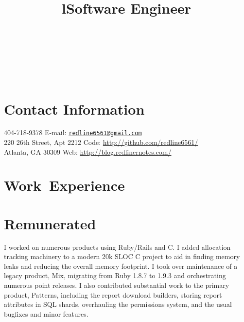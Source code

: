 \documentclass[margintitle,line]{res}
\renewcommand{\subsection}[1]{\section{\normalfont #1}}
\begin{document}

\begin{resume}

\begin{format}
\\
\title{l}\\
\body\\
\end{format}



\section{Contact Information}

404-718-9378 \hfill {E-mail:} \href{mailto:redline6561@gmail.com}{\nolinkurl{redline6561@gmail.com}} \\
220 26th Street, Apt 2212 \hfill {Code:} \url{http://github.com/redline6561/} \\
Atlanta, GA 30309 \hfill {Web:} \url{http://blog.redlinernotes.com/} \\


\section{\mbox{Work Experience}}

\subsection{Remunerated}

\title{Software Engineer}
\begin{position}
  I worked on numerous products using Ruby/Rails and C. I added allocation
  tracking machinery to a modern 20k SLOC C project to aid in finding memory
  leaks and reducing the overall memory footprint. I took over maintenance of
  a legacy product, Mix, migrating from Ruby 1.8.7 to 1.9.3 and orchestrating
  numerous point releases. I also contributed substantial work to the primary
  product, Patterns, including the report download builders, storing report
  attributes in SQL shards, overhauling the permissions system, and the usual
  bugfixes and minor features.
\end{position}


\end{resume}
\end{document}
